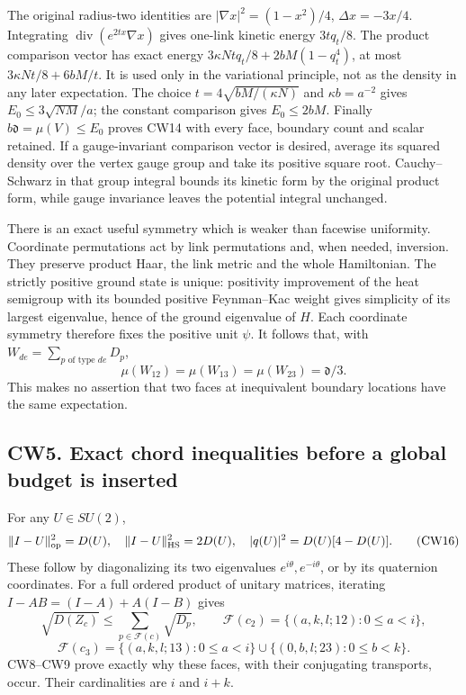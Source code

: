 \documentclass[11pt]{article}
\begin{document}
The original radius-two identities are
\(|\nabla x|^2=(1-x^2)/4\), \(\Delta x=-3x/4\). Integrating
\(\operatorname{div}(e^{2tx}\nabla x)\) gives one-link kinetic
energy \(3tq_t/8\). The product comparison vector has exact
energy
\(3\kappa Ntq_t/8+2bM(1-q_t^4)\), at most
\(3\kappa Nt/8+6bM/t\). It is used only in the variational
principle, not as the density in any later expectation. The choice
\(t=4\sqrt{bM/(\kappa N)}\) and \(\kappa b=a^{-2}\) gives
\(E_0\le3\sqrt{NM}/a\); the constant comparison gives
\(E_0\le2bM\). Finally \(b\mathfrak d=\mu(V)\le E_0\)
proves CW14 with every face, boundary count and scalar retained.
If a gauge-invariant comparison vector is desired, average its
squared density over the vertex gauge group and take its positive
square root. Cauchy–Schwarz in that group integral bounds its
kinetic form by the original product form, while gauge invariance
leaves the potential integral unchanged.

There is an exact useful symmetry which is weaker than facewise
uniformity. Coordinate permutations act by link permutations and,
when needed, inversion. They preserve product Haar, the link
metric and the whole Hamiltonian. The strictly positive ground
state is unique: positivity improvement of the heat semigroup
with its bounded positive Feynman–Kac weight gives simplicity of
its largest eigenvalue, hence of the ground eigenvalue of \(H\).
Each coordinate symmetry therefore fixes the positive unit
\(\psi\). It follows that, with
\(W_{de}=\sum_{p\text{ of type }de}D_p\),
\[
 \mu(W_{12})=\mu(W_{13})=\mu(W_{23})=\mathfrak d/3.
                                                               \tag{CW15}
\]
This makes no assertion that two faces at inequivalent boundary
locations have the same expectation.

\subsection*{CW5. Exact chord inequalities before a global budget is inserted}

For any \(U\in SU(2)\),
\[
 \|I-U\|_{\rm op}^2=D(U),\quad
 \|I-U\|_{\rm HS}^2=2D(U),\quad
 |q(U)|^2=D(U)[4-D(U)].                                     \tag{CW16}
\]
These follow by diagonalizing its two eigenvalues
\(e^{i\theta},e^{-i\theta}\), or by its quaternion coordinates.
For a full ordered product of unitary matrices, iterating
\(I-AB=(I-A)+A(I-B)\) gives
\[
 \sqrt{D(Z_c)}\le\sum_{p\in\mathcal F(c)}\sqrt{D_p},
 \qquad
 \mathcal F(c_2)=\{(a,k,l;12):0\le a<i\},
\]
\[
 \mathcal F(c_3)=\{(a,k,l;13):0\le a<i\}
                \cup\{(0,b,l;23):0\le b<k\}.              \tag{CW17}
\]
CW8–CW9 prove exactly why these faces, with their conjugating
transports, occur. Their cardinalities are \(i\) and \(i+k\).
\end{document}
